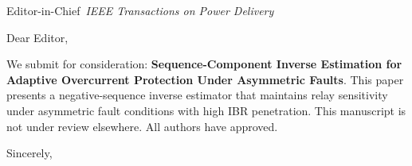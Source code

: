 \documentclass[11pt,a4paper]{letter}
\begin{document}
\begin{letter}{Editor-in-Chief\ \textit{IEEE Transactions on Power Delivery}}
\opening{Dear Editor,}
We submit for consideration: \textbf{Sequence-Component Inverse Estimation for Adaptive Overcurrent Protection Under Asymmetric Faults}.
This paper presents a negative-sequence inverse estimator that maintains relay sensitivity under asymmetric fault conditions with high IBR penetration.
This manuscript is not under review elsewhere. All authors have approved.
\closing{Sincerely,}
\end{letter}
\end{document}
